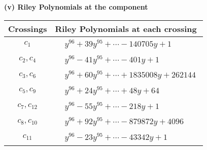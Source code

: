 \documentclass[1p]{elsarticle_modified}
\theoremstyle{definition}
\begin{document}
\flushleft \textbf{(v) Riley Polynomials at the component}\newline \\
\begin{tabular}{m{50pt}|m{274pt}}
Crossings & \hspace{64pt}Riley Polynomials at each crossing \\
\hline $$\begin{aligned}c_{1}\end{aligned}$$&$\begin{aligned}
&y^{96}+39 y^{95}+\cdots-140705 y+1
\end{aligned}$\\
\hline $$\begin{aligned}c_{2},c_{4}\end{aligned}$$&$\begin{aligned}
&y^{96}-41 y^{95}+\cdots-401 y+1
\end{aligned}$\\
\hline $$\begin{aligned}c_{3},c_{6}\end{aligned}$$&$\begin{aligned}
&y^{96}+60 y^{95}+\cdots+1835008 y+262144
\end{aligned}$\\
\hline $$\begin{aligned}c_{5},c_{9}\end{aligned}$$&$\begin{aligned}
&y^{96}+24 y^{95}+\cdots+48 y+64
\end{aligned}$\\
\hline $$\begin{aligned}c_{7},c_{12}\end{aligned}$$&$\begin{aligned}
&y^{96}-55 y^{95}+\cdots-218 y+1
\end{aligned}$\\
\hline $$\begin{aligned}c_{8},c_{10}\end{aligned}$$&$\begin{aligned}
&y^{96}+92 y^{95}+\cdots-879872 y+4096
\end{aligned}$\\
\hline $$\begin{aligned}c_{11}\end{aligned}$$&$\begin{aligned}
&y^{96}-23 y^{95}+\cdots-43342 y+1
\end{aligned}$\\
\hline
\end{tabular}\\~\\
\end{document}
